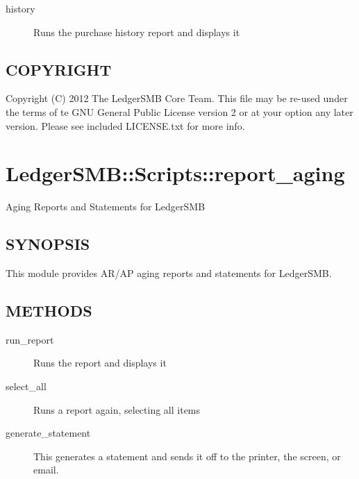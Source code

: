 \begin{description}
\begin{description}
\item[{history}] \mbox{}

Runs the purchase history report and displays it

\end{description}
\subsection*{COPYRIGHT\label{LedgerSMB::Scripts::report_aging_COPYRIGHT}}


Copyright (C) 2012 The LedgerSMB Core Team.  This file may be re-used under the
terms of te GNU General Public License version 2 or at your option any later
version.  Please see included LICENSE.txt for more info.

\section{LedgerSMB::Scripts::report\_aging\label{LedgerSMB::Scripts::report_aging}}


Aging Reports and Statements for LedgerSMB

\subsection*{SYNOPSIS\label{LedgerSMB::Scripts::report_aging_SYNOPSIS}}


This module provides AR/AP aging reports and statements for LedgerSMB.

\subsection*{METHODS\label{LedgerSMB::Scripts::report_aging_METHODS}}
\begin{description}

\item[{run\_report}] \mbox{}

Runs the report and displays it


\item[{select\_all}] \mbox{}

Runs a report again, selecting all items


\item[{generate\_statement}] \mbox{}

This generates a statement and sends it off to the printer, the screen, or
email.


\end{description}
\end{description}
